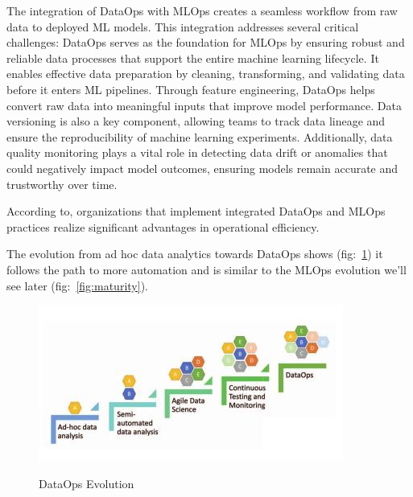 The integration of DataOps with MLOps creates a seamless workflow from raw data to deployed ML models.
This integration addresses several critical challenges\cite{ad-hoc-dataops}:
DataOps serves as the foundation for MLOps by ensuring robust and reliable data processes that support the entire machine learning lifecycle.
It enables effective data preparation by cleaning, transforming, and validating data before it enters ML pipelines.
Through feature engineering, DataOps helps convert raw data into meaningful inputs that improve model performance.
Data versioning is also a key component, allowing teams to track data lineage and ensure the reproducibility of machine learning experiments.
Additionally, data quality monitoring plays a vital role in detecting data drift or anomalies that could negatively impact model outcomes, ensuring models remain accurate and trustworthy over time.

According to\cite{dataops-mlops}, organizations that implement integrated DataOps and MLOps practices
realize significant advantages in
operational efficiency.

The evolution from ad hoc data analytics towards DataOps shows (fig:~\ref{fig:dataops-evo}) it follows the path to more automation
and is similar to the MLOps evolution we'll see later (fig:~\ref{fig:maturity}).
\begin{figure}[!htbp]
    \caption{DataOps Evolution\cite{ad-hoc-dataops}}
    \centering
    \includegraphics[scale=0.6]{images/dataops-evo}
    \label{fig:dataops-evo}
\end{figure}

